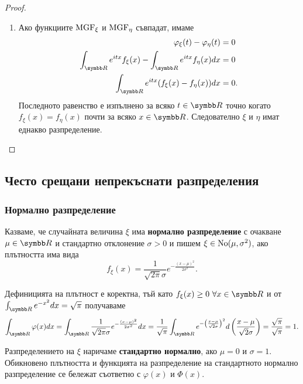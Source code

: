 \documentclass[numbers=endperiod, bibliography=totocnumbered]{scrartcl}
\begin{document}
\begin{proof}
\begin{enumerate}
    \item Ако функциите \( \operatorname{MGF}_\xi \) и \( \operatorname{MGF}_\eta \) съвпадат, имаме
    \begin{align*}
      \Char_\xi(t) - \Char_\eta(t) &= 0
      \\
      \int_{\R} e^{itx} f_\xi(x) - \int_{\R} e^{itx} f_\eta(x) dx &= 0
      \\
      \int_{\R} e^{itx} (f_\xi(x) - f_\eta(x)) dx &= 0.
    \end{align*}
    Последното равенство е изпълнено за всяко \( t \in \R \) точно когато \( f_\xi(x) = f_\eta(x) \) почти за всяко \( x \in \R \). Следователно \( \xi \) и \( \eta \) имат еднакво разпределение.
  \end{enumerate}
\end{proof}

\subsection{Често срещани непрекъснати разпределения}

\subsubsection{Нормално разпределение}\label{dist:normal}

\begin{definition}
  Казваме, че случайната величина \( \xi \) има \textbf{нормално разпределение} с очакване \( \mu \in \R \) и стандартно отклонение \( \sigma > 0 \) и пишем \( \xi \in \operatorname{No}(\mu, \sigma^2) \), ако плътността има вида
  \begin{equation*}
    f_\xi(x) = \frac 1 {\sqrt{2\pi} \sigma} e^{-\frac{{(x-\mu)}^2} {2\sigma^2}}.
  \end{equation*}

  Дефиницията на плътност е коректна, тъй като \( f_\xi(x) \geq 0~\forall x \in \R \) и от \( \int_{\R} e^{-x^2} dx = \sqrt \pi \) получаваме
  \begin{equation*}
    \int_{\R} \varphi(x) dx
    =
    \int_{\R} \frac 1 {\sqrt{2\pi} \sigma} e^{-\frac{{(x-\mu)}^2} {2\sigma^2}} dx
    =
    \frac 1 {\sqrt{\pi}} \int_{\R} e^{-{\left(\frac {x-\mu} {\sqrt 2 \sigma} \right)}^2} d\left(\frac {x-\mu} {\sqrt 2 \sigma} \right)
    =
    \frac {\sqrt{\pi}} {\sqrt{\pi}}
    =
    1.
  \end{equation*}

  Разпределението на \( \xi \) наричаме \textbf{стандартно нормално}, ако \( \mu = 0 \) и \( \sigma = 1 \). Обикновено плътността и функцията на разпределение на стандартното нормално разпределение се бележат съответно с \( \varphi(x) \) и \( \Phi(x) \).
\end{definition}
\end{document}
